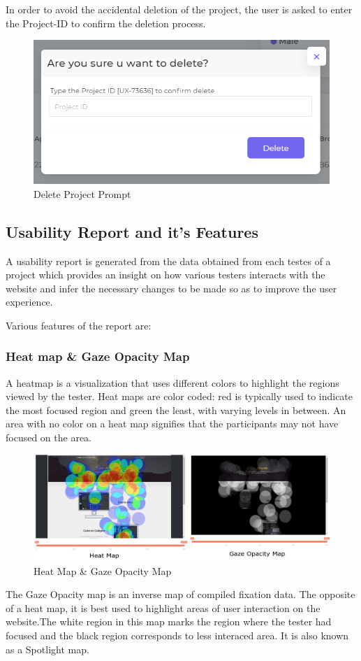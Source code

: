 \documentclass[hidelinks,12pt,a4paper,final]{extreport}
\begin{document}
In order to avoid the accidental deletion of the project, the user is asked to enter the Project-ID to confirm the deletion process.
\begin{figure}[H]
    \centering
    \includegraphics[scale=.8]{delete-project.png}
    \caption{Delete Project Prompt}
\end{figure}

\newpage
\subsection{Usability Report and it's Features}
A usability report is generated from the data obtained from each testes of a project which provides an insight on how various testers interacts with the website and infer the necessary changes to be made so as to improve the user experience.

Various features of the report are:
\subsubsection{Heat map \& Gaze Opacity Map}
A heatmap is a visualization that uses different colors to highlight the regions viewed by the tester. Heat maps are color coded: red is typically used to indicate the most focused region and
green the least, with varying levels in between. An area with no color on a heat map signifies that the participants may not have focused on the area.
\begin{figure}[H]
    \centering
    \includegraphics[width=\linewidth]{heat & gaze map.png}
    \caption{Heat Map \& Gaze Opacity Map}
\end{figure}
The Gaze Opacity map is an inverse map of compiled fixation data. The opposite of a heat map, it is best used to highlight
areas of user interaction on the website.The white region in this map marks the region where the tester had focused and the black region corresponds to less interaced area.
It is also known as a Spotlight map.
\end{document}
